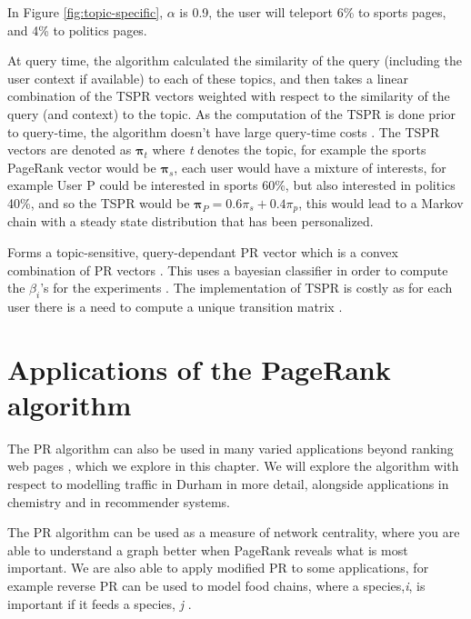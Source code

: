 \documentclass[11pt]{report}
\begin{document}
{In Figure \ref{fig:topic-specific}, $\alpha$ is 0.9, the user will teleport 6\% to sports pages, and 4\% to politics pages.

At query time, the algorithm calculated the similarity of the query (including the user context if available) to each of these topics, and then takes a linear combination of the TSPR vectors weighted with respect to the similarity of the query (and context) to the topic. As the computation of the TSPR is done prior to query-time, the algorithm doesn't have large query-time costs \cite{haveliwala2002topic}.  The TSPR vectors are denoted as $\boldsymbol{\pi}_t$ where \textit{t} denotes the topic, for example the sports PageRank vector would be $\boldsymbol{\pi}_s$, each user would have a mixture of interests, for example User P could be interested in sports 60\%, but also interested in politics 40\%, and so the TSPR would be $\boldsymbol{\pi}_P=0.6\pi_s+0.4\pi_p$, this would lead to a Markov chain with a steady state distribution that has been personalized. 


Forms a topic-sensitive, query-dependant PR vector which is a convex combination of PR vectors \cite{langville}. This uses a bayesian classifier in order to compute the $\beta_i$'s for the experiments \cite{langville}.   The implementation of TSPR is costly as for each user there is a need to compute a unique transition matrix \cite{manning}. 

\chapter{Applications of the PageRank algorithm} \label{chap:Applications}

The PR algorithm can also be used in many varied applications beyond ranking web pages \cite{gleich2015pagerank}, which we explore in this chapter. We will explore the algorithm with respect to modelling traffic in Durham in more detail, alongside applications in chemistry and in recommender systems. 

The PR algorithm can be used as a measure of network centrality, where you are able to understand a graph better when PageRank reveals what is most important. We are also able to apply modified PR to some applications, for example reverse PR can be used to model food chains, where a species,\textit{i}, is important if it feeds a species, \textit{j} \cite{allesina2009googling}. 

}
\end{document}
